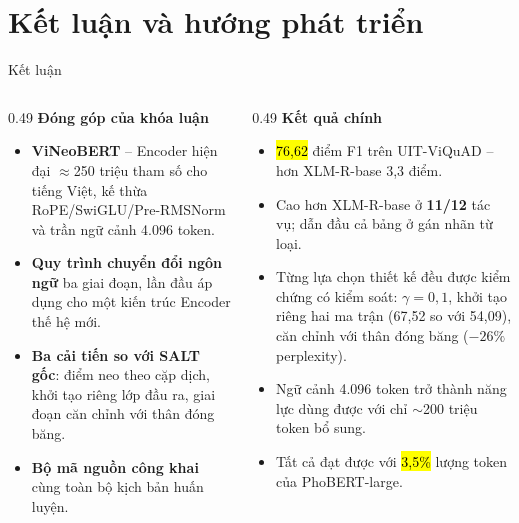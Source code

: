 \section{Kết luận và hướng phát triển}

\begin{frame}{Kết luận}
\vspace{0.3em}
\begin{columns}[T]
\begin{column}{0.49\textwidth}
  \textbf{Đóng góp của khóa luận}
  \begin{itemize}\itemsep2pt
    \item \textbf{ViNeoBERT} -- Encoder hiện đại $\approx$250 triệu tham số
          cho tiếng Việt, kế thừa RoPE/SwiGLU/Pre-RMSNorm và trần ngữ cảnh
          4.096 token.
    \item \textbf{Quy trình chuyển đổi ngôn ngữ} ba giai đoạn, lần đầu áp
          dụng cho một kiến trúc Encoder thế hệ mới.
    \item \textbf{Ba cải tiến so với SALT gốc}: điểm neo theo cặp dịch,
          khởi tạo riêng lớp đầu ra, giai đoạn căn chỉnh với thân đóng băng.
    \item \textbf{Bộ mã nguồn công khai} cùng toàn bộ kịch bản huấn luyện.
  \end{itemize}
\end{column}

\begin{column}{0.49\textwidth}
  \textbf{Kết quả chính}
  \begin{itemize}\itemsep2pt
    \item \hl{76,62} điểm F1 trên UIT-ViQuAD -- hơn XLM-R-base 3,3 điểm.
    \item Cao hơn XLM-R-base ở \textbf{11/12} tác vụ; dẫn đầu cả bảng ở gán
          nhãn từ loại.
    \item Từng lựa chọn thiết kế đều được kiểm chứng có kiểm soát:
          $\gamma=0{,}1$, khởi tạo riêng hai ma trận (67,52 so với 54,09),
          căn chỉnh với thân đóng băng ($-26\%$ perplexity).
    \item Ngữ cảnh 4.096 token trở thành năng lực dùng được với chỉ
          $\sim$200 triệu token bổ sung.
    \item[$\Rightarrow$] Tất cả đạt được với \hl{3,5\%} lượng token của
          PhoBERT-large.
  \end{itemize}
\end{column}
\end{columns}
\end{frame}

